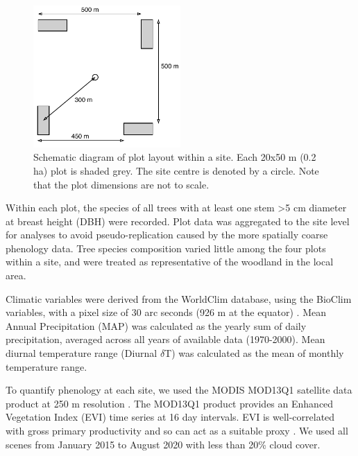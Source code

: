 \documentclass[11pt,a4paper]{article}
\begin{document}
\begin{figure}[H]
\centering
	\includegraphics[width=0.5\textwidth]{schematic.drawio}
	\caption{Schematic diagram of plot layout within a site. Each 20x50 m (0.2 ha) plot is shaded grey. The site centre is denoted by a circle. Note that the plot dimensions are not to scale.}
	\label{schematic}
\end{figure}

Within each plot, the species of all trees with at least one stem >5 cm diameter at breast height (DBH) were recorded. Plot data was aggregated to the site level for analyses to avoid pseudo-replication caused by the more spatially coarse phenology data. Tree species composition varied little among the four plots within a site, and were treated as representative of the woodland in the local area.

Climatic variables were derived from the WorldClim database, using the BioClim variables, with a pixel size of 30 arc seconds (926 m at the equator) \citep{Fick2017}. Mean Annual Precipitation (MAP) was calculated as the yearly sum of daily precipitation, averaged across all years of available data (1970-2000). Mean diurnal temperature range (Diurnal $\delta$T) was calculated as the mean of monthly temperature range. 

To quantify phenology at each site, we used the MODIS MOD13Q1 satellite data product at 250 m resolution \citep{}. The MOD13Q1 product provides an Enhanced Vegetation Index (EVI) time series at 16 day intervals. EVI is well-correlated with gross primary productivity and so can act as a suitable proxy \citep{}. We used all scenes from January 2015 to August 2020 with less than 20\% cloud cover.
\end{document}
